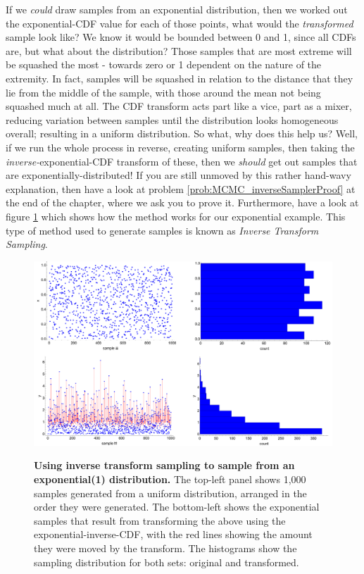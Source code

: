 \documentclass[11pt,fullpage]{book}
\begin{document}
If we \textit{could} draw samples from an exponential distribution, then we worked out the exponential-CDF value for each of those points, what would the \textit{transformed} sample look like? We know it would be bounded between 0 and 1, since all CDFs are, but what about the distribution? Those samples that are most extreme will be squashed the most - towards zero or 1 dependent on the nature of the extremity. In fact, samples will be squashed in relation to the distance that they lie from the middle of the sample, with those around the mean not being squashed much at all. The CDF transform acts part like a vice, part as a mixer, reducing variation between samples until the distribution looks homogeneous overall; resulting in a uniform distribution. So what, why does this help us? Well, if we run the whole process in reverse, creating uniform samples, then taking the \textit{inverse-}exponential-CDF transform of these, then we \textit{should} get out samples that are exponentially-distributed! If you are still unmoved by this rather hand-wavy explanation, then have a look at problem \ref{prob:MCMC_inverseSamplerProof} at the end of the chapter, where we ask you to prove it. Furthermore, have a look at figure \ref{fig:MCMC_inverseSamplingExponential} which shows how the method works for our exponential example. This type of method used to generate samples is known as \textit{Inverse Transform Sampling}.

\begin{figure}
\centering
\scalebox{0.3} 
{\includegraphics{MCMC_inverseSamplingExponential.pdf}}
\caption{\textbf{Using inverse transform sampling to sample from an exponential(1) distribution.} The top-left panel shows 1,000 samples generated from a uniform distribution, arranged in the order they were generated. The bottom-left shows the exponential samples that result from transforming the above using the exponential-inverse-CDF, with the red lines showing the amount they were moved by the transform. The histograms show the sampling distribution for both sets: original and transformed.}\label{fig:MCMC_inverseSamplingExponential}
\end{figure}
\end{document}

